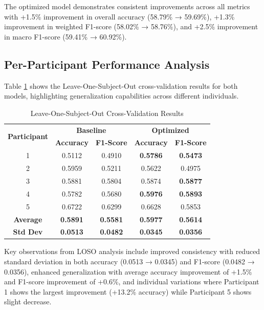 \documentclass{iopconfser}
\begin{document}
The optimized model demonstrates consistent improvements across all metrics with +1.5\% improvement in overall accuracy (58.79\% → 59.69\%), +1.3\% improvement in weighted F1-score (58.02\% → 58.76\%), and +2.5\% improvement in macro F1-score (59.41\% → 60.92\%).

\subsection{Per-Participant Performance Analysis}

Table \ref{tab:loso_results} shows the Leave-One-Subject-Out cross-validation results for both models, highlighting generalization capabilities across different individuals.

\begin{table}[H]
\centering
\caption{Leave-One-Subject-Out Cross-Validation Results}
\label{tab:loso_results}
\begin{tabular}{ccccc}
\toprule
\multirow{2}{*}{\textbf{Participant}} & \multicolumn{2}{c}{\textbf{Baseline}} & \multicolumn{2}{c}{\textbf{Optimized}} \\
\cmidrule(lr){2-3} \cmidrule(lr){4-5}
& \textbf{Accuracy} & \textbf{F1-Score} & \textbf{Accuracy} & \textbf{F1-Score} \\
\midrule
1 & 0.5112 & 0.4910 & \textbf{0.5786} & \textbf{0.5473} \\
2 & 0.5959 & 0.5211 & 0.5622 & 0.4975 \\
3 & 0.5881 & 0.5804 & 0.5874 & \textbf{0.5877} \\
4 & 0.5782 & 0.5680 & \textbf{0.5976} & \textbf{0.5893} \\
5 & 0.6722 & 0.6299 & 0.6628 & 0.5853 \\
\midrule
\textbf{Average} & \textbf{0.5891} & \textbf{0.5581} & \textbf{0.5977} & \textbf{0.5614} \\
\textbf{Std Dev} & \textbf{0.0513} & \textbf{0.0482} & \textbf{0.0345} & \textbf{0.0356} \\
\bottomrule
\end{tabular}
\end{table}

Key observations from LOSO analysis include improved consistency with reduced standard deviation in both accuracy (0.0513 → 0.0345) and F1-score (0.0482 → 0.0356), enhanced generalization with average accuracy improvement of +1.5\% and F1-score improvement of +0.6\%, and individual variations where Participant 1 shows the largest improvement (+13.2\% accuracy) while Participant 5 shows slight decrease.
\end{document}
